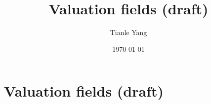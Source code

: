 \documentclass{noteformyself}
\title{Valuation fields (draft)}
\author{Tianle Yang}
\date{\today}
\begin{document}
    \maketitle

    \section{Valuation fields (draft)}



\end{document}
